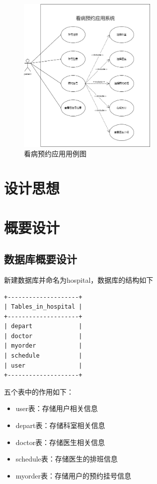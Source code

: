 \documentclass[UTF8,12pt]{article}
\begin{document}
\begin{figure}[htbp]
    \centering
    \includegraphics[width=0.6\textwidth]{imgs/1.png}
    \caption{看病预约应用用例图}
\end{figure}



\newpage

\section{设计思想}

\newpage

\section{概要设计}

\subsection{数据库概要设计}
新建数据库并命名为hospital，数据库的结构如下

\begin{lstlisting}[frame=shadowbox]
+--------------------+
| Tables_in_hospital |
+--------------------+
| depart             |
| doctor             |
| myorder            |
| schedule           |
| user               |
+--------------------+
\end{lstlisting}

五个表中的作用如下：

\begin{itemize}
    \item user表：存储用户相关信息
    \item depart表：存储科室相关信息
    \item doctor表：存储医生相关信息
    \item schedule表：存储医生的排班信息
    \item myorder表：存储用户的预约挂号信息
\end{itemize}
\end{document}
